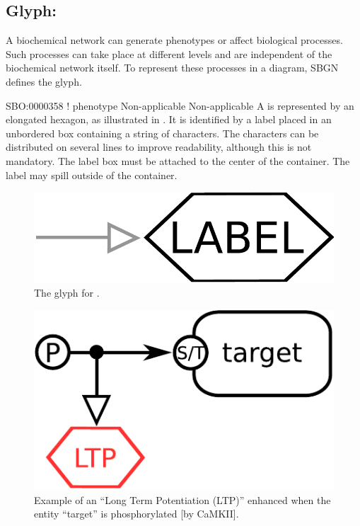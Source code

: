 
\color{ForestGreen}

\subsection{Glyph: }
\label{sec:phenotype}

A biochemical network can generate phenotypes or affect biological
processes.  Such processes can take place at different levels and are
independent of the biochemical network itself.  To represent these
processes in a diagram, SBGN defines the  glyph.

\begin{glyphDescription}

\glyphSboTerm SBO:0000358 ! phenotype
\glyphOrigin Non-applicable
\glyphTarget Non-applicable
\glyphEndPoint A  is represented by an elongated
hexagon, as illustrated in . It is identified by a label placed in an
unbordered box containing a string of characters.  The characters can be
distributed on several lines to improve readability, although this is not
mandatory.  The label box must be attached to the center of the
 container.  The label may spill outside of the container.

\end{glyphDescription}
 
\begin{figure}[H]
  \centering
  \includegraphics[scale = 0.3]{images/phenotype}
  \caption{The \ER glyph for .}
  \label{fig:phenotype}
\end{figure}

\begin{figure}[H]
  \centering
  \includegraphics[scale = 0.5]{examples/ex-phenotype}
  \caption{Example of an  ``Long Term Potentiation (LTP)'' enhanced when the entity ``target'' is phosphorylated [by CaMKII].}
  \label{fig:ex-phenotype}
\end{figure}

\normalcolor
